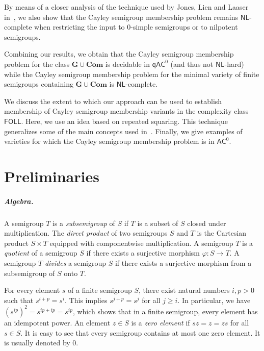 \documentclass{toc}
\renewcommand{\geq}{\geqslant}
\renewcommand{\ge}{\geq}
\newcommand{\union}{\mathbin{\cup}}
\newcommand{\FOLL}{\ensuremath{\mathsf{FOLL}}}
\newcommand{\AC}{\ensuremath{\mathsf{AC}}}
\newcommand{\qAC}{\ensuremath{\mathsf{qAC}}}
\newcommand{\NL}{\ensuremath{\mathsf{NL}}}
\newcommand{\vCom}{\mathbf{Com}}
\newcommand{\vG}{\mathbf{G}}
\newcommand{\SCSM}{Cayley semigroup membership}
\newcommand{\SCSMP}{{\SCSM} problem}
\begin{document}
By means of a closer analysis of the technique used by Jones, Lien and Laaser
in~\cite{JonesLL76}, we also show that the {\SCSMP} remains $\NL$-complete when
restricting the input to $0$-simple semigroups or to nilpotent semigroups.

Combining our results, we obtain that the {\SCSMP} for the class
$\vG \union \vCom$ 
is decidable in $\qAC^0$ (and thus not $\NL$-hard) while the {\SCSMP}
for the minimal variety of finite semigroups containing $\vG \union \vCom$ is
$\NL$-complete.

We discuss the extent to which our approach can be used to establish
membership of {\SCSM} variants %
in  %
the complexity class $\FOLL$.
%
Here, we use an idea based on repeated squaring. This technique generalizes
some of the main concepts used in~\cite{BarringtonKLM01}.
%
Finally, we give examples of varieties for which the {\SCSMP} is in $\AC^0$.

\section{Preliminaries}
\label{sec:prelim}

\subparagraph{Algebra.}

A semigroup $T$ is a \emph{subsemigroup} of $S$ if $T$ is a subset of $S$
closed under multiplication.
%
The \emph{direct product} of two semigroups $S$ and $T$ is the Cartesian
product $S \times T$ equipped with componentwise multiplication.
%
A semigroup $T$ is a \emph{quotient} of a semigroup $S$ if there exists a
surjective morphism $\varphi \colon S \to T$.
%
A semigroup $T$ \emph{divides} a semigroup $S$ if there exists a surjective
morphism from a subsemigroup of $S$ onto $T$.

For every element $s$ of a finite semigroup $S$, there exist natural
numbers $i, p > 0$ such that $s^{i+p} = s^i$.
%
This implies $s^{j+p} = s^j$ for all $j \ge i$. In particular, we have
$(s^{ip})^2 = s^{ip + ip} = s^{ip}$, which shows that in a finite semigroup,
every element has an idempotent power.
%
An element $z \in S$ is a \emph{zero element} if $sz = z = zs$ for all $s \in
S$. It is easy to see that every semigroup contains at most one zero element.
It is usually denoted by $0$.
\end{document}
